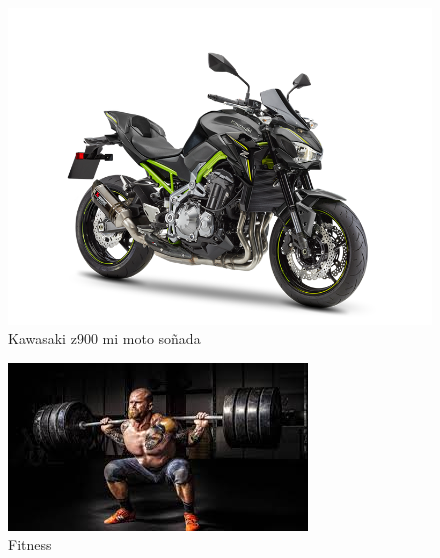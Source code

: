 \begin{figure}[h]
  \centering
  \includegraphics[scale=0.5]{IMG/8_1.png}
  \caption{\small Kawasaki z900 mi moto soñada} \label{fig:8_1}
\end{figure}

\begin{figure}[h]
  \centering
  \includegraphics[scale=0.8]{IMG/8_2.jpg}
  \caption{\small Fitness } \label{fig:8_2}
\end{figure}

